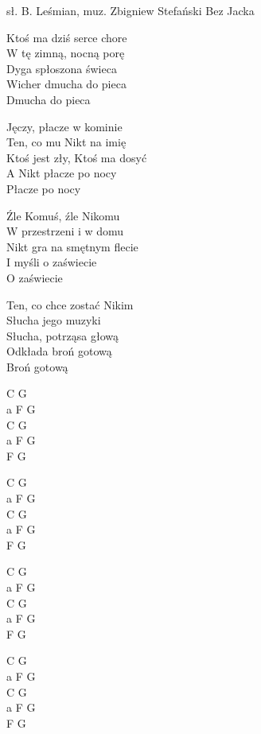 {sł. B. Leśmian, muz. Zbigniew Stefański}
{Bez Jacka}
\begin{text}
Ktoś ma dziś serce chore\\
W tę zimną, nocną porę\\
Dyga spłoszona świeca\\
Wicher dmucha do pieca\\
Dmucha do pieca

Jęczy, płacze w kominie\\
Ten, co mu Nikt na imię\\
Ktoś jest zły, Ktoś ma dosyć\\
A Nikt płacze po nocy\\
Płacze po nocy

Źle Komuś, źle Nikomu\\
W przestrzeni i w domu\\
Nikt gra na smętnym flecie\\
I myśli o zaświecie\\
O zaświecie

Ten, co chce zostać Nikim\\
Słucha jego muzyki\\
Słucha, potrząsa głową\\
Odkłada broń gotową\\
Broń gotową
\end{text}
\begin{chord}
    C G\\
    a F G\\
    C G\\
    a F G\\
    F G

    C G\\
    a F G\\
    C G\\
    a F G\\
    F G

    C G\\
    a F G\\
    C G\\
    a F G\\
    F G

    C G\\
    a F G\\
    C G\\
    a F G\\
    F G
\end{chord}